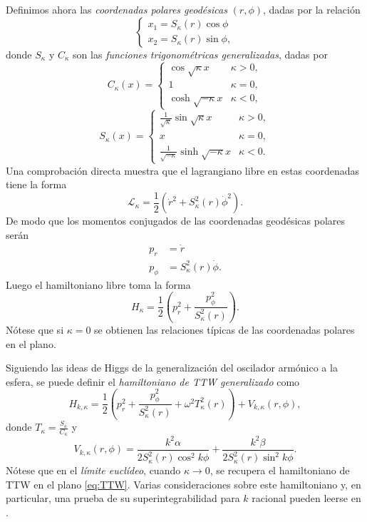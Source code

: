 \documentclass[12pt,a4paper,twoside]{article}
\theoremstyle{definition} \newtheorem{defn}[thm]{Definición}
\theoremstyle{definition} \newtheorem{ejemplo}[thm]{Ejemplo}
\theoremstyle{definition} \newtheorem{ejercicio}[thm]{Ejercicio}
\theoremstyle{remark} \newtheorem*{obs}{Observación}
\begin{document}
Definimos ahora las \emph{coordenadas polares geodésicas} $(r,\phi)$, dadas por la relación
\begin{equation}
  \begin{cases}
    x_1=S_\kappa (r)\cos \phi\\
    x_2=S_\kappa (r)\sin \phi,
  \end{cases}
\end{equation}
donde $S_\kappa$ y $C_\kappa$ son las \emph{funciones trigonométricas generalizadas}, dadas por
\begin{equation}
  C_{\kappa}(x)=
  \begin{cases}
    \cos \sqrt{\kappa} x & \kappa >0, \\
    1 & \kappa =0, \\
    \cosh \sqrt{-\kappa} x & \kappa <0, 
  \end{cases}
\end{equation}
\begin{equation}
  S_{\kappa}(x)=
  \begin{cases}
    \frac{1}{\sqrt{\kappa}}\sin \sqrt{\kappa} x & \kappa >0, \\
    x & \kappa =0, \\
    \frac{1}{\sqrt{-\kappa}}\sinh \sqrt{-\kappa} x & \kappa <0. 
  \end{cases}
\end{equation}
Una comprobación directa muestra que el lagrangiano libre en estas coordenadas tiene la forma
\begin{equation}
  \mathcal{L} _\kappa = \frac{1}{2}(\dot{r}^2+S_{\kappa}^2 (r) \dot{\phi}^2).
\end{equation}
De modo que los momentos conjugados de las coordenadas geodésicas polares serán
\begin{align}
  p_r&=\dot{r} \\ 
  p_{\phi}&=S_{\kappa}^2(r) \dot{\phi}.
\end{align}
Luego el hamiltoniano libre toma la forma
\begin{equation}
  H_{\kappa}=\frac{1}{2}\left( p_r^2 + \frac{p^2_\phi}{S_{\kappa}^2(r)} \right) .
\end{equation}
Nótese que si $\kappa=0$ se obtienen las relaciones típicas de las coordenadas polares en el plano.
  
Siguiendo las ideas de Higgs \cite{higgs} de la generalización del oscilador armónico a la esfera, se puede definir el \emph{hamiltoniano de TTW generalizado} como
\begin{equation}
  H_{k,\kappa}=\frac{1}{2}\left( p_r^2 + \frac{p^2_\phi}{S_{\kappa}^2(r)}+ \omega^2 T_\kappa^2(r)\right) + V_{k,\kappa}(r,\phi)  ,
\end{equation}
donde $T_{\kappa}=\frac{S_\kappa}{C_\kappa}$ y
\begin{equation}
  V_{k,\kappa}(r,\phi)=\frac{k^2\alpha}{2S_\kappa^2(r)\cos^2k\phi} +\frac{k^2\beta}{2S_\kappa^2(r)\sin^2 k\phi}.
\end{equation}
Nótese que en el \emph{límite euclídeo}, cuando $\kappa\rightarrow 0$, se recupera el hamiltoniano de TTW en el plano \eqref{eq:TTW}. Varias consideraciones sobre este hamiltoniano y, en particular, una prueba de su superintegrabilidad para $k$ racional pueden leerse en \cite{ranada}.
\end{document}
